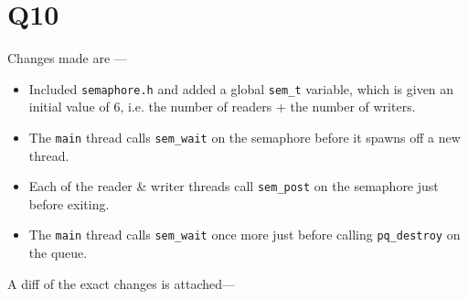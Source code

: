 \documentclass[runningheads,a4paper]{report}
\begin{document}
\section*{Q10}

Changes made are ---
\begin{itemize}
  \item Included \texttt{semaphore.h} and added a global
    \texttt{sem\_t} variable, which is given an initial value of $6$,
    i.e. the number of readers + the number of writers.
  \item The \texttt{main} thread calls \texttt{sem\_wait} on the
    semaphore before it spawns off a new thread.
  \item Each of the reader \& writer threads call \texttt{sem\_post}
    on  the semaphore just before exiting.
  \item The \texttt{main} thread calls \texttt{sem\_wait} once more
    just before calling \texttt{pq\_destroy} on the queue.
\end{itemize}

A diff of the exact changes is attached---


\end{document}
